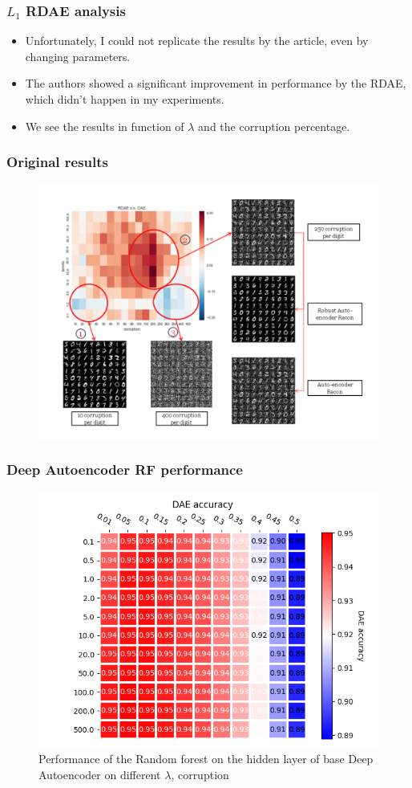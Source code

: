 \documentclass{beamer}
\theoremstyle{plain}
\theoremstyle{definition}
\theoremstyle{remark}
\begin{document}
\begin{frame}
	\frametitle{$L_1$ RDAE analysis}
	\begin{itemize}
		\item Unfortunately, I could not replicate the results by the article, even by changing parameters.
		\item The authors showed a significant improvement in performance by the RDAE, which didn't happen in my experiments.
		\item We see the results in function of $\lambda$ and the corruption percentage.
	\end{itemize}
\end{frame}

\begin{frame}
	\frametitle{Original results}
	\begin{figure}
		\centering
		\includegraphics[width=0.8\linewidth]{Images/original_l1.png}
	\end{figure}
\end{frame}

\begin{frame}
	\frametitle{Deep Autoencoder RF performance}
	\begin{figure}
		\centering
		\includegraphics[width=0.65\linewidth]{Images/DAE_acc.png}
		\caption[]{Performance of the Random forest on the hidden layer of base Deep Autoencoder on different $\lambda$, corruption}
	\end{figure}
\end{frame}
\end{document}
